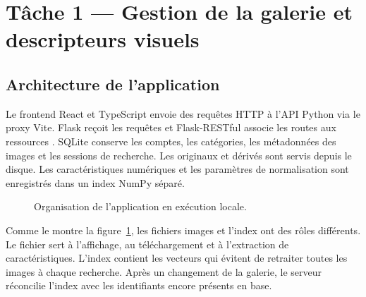 \section{Tâche 1 — Gestion de la galerie et descripteurs visuels}

\subsection{Architecture de l'application}
Le frontend React et TypeScript envoie des requêtes HTTP à l'API Python via le proxy Vite. Flask reçoit les requêtes et Flask-RESTful associe les routes aux ressources \cite{flaskrestful}. SQLite conserve les comptes, les catégories, les métadonnées des images et les sessions de recherche. Les originaux et dérivés sont servis depuis le disque. Les caractéristiques numériques et les paramètres de normalisation sont enregistrés dans un index NumPy séparé.

\begin{figure}[ht]
  \centering
  \caption{Organisation de l'application en exécution locale.}
  \label{fig:architecture}
\end{figure}

Comme le montre la figure~\ref{fig:architecture}, les fichiers images et l'index ont des rôles différents. Le fichier sert à l'affichage, au téléchargement et à l'extraction de caractéristiques. L'index contient les vecteurs qui évitent de retraiter toutes les images à chaque recherche. Après un changement de la galerie, le serveur réconcilie l'index avec les identifiants encore présents en base.

